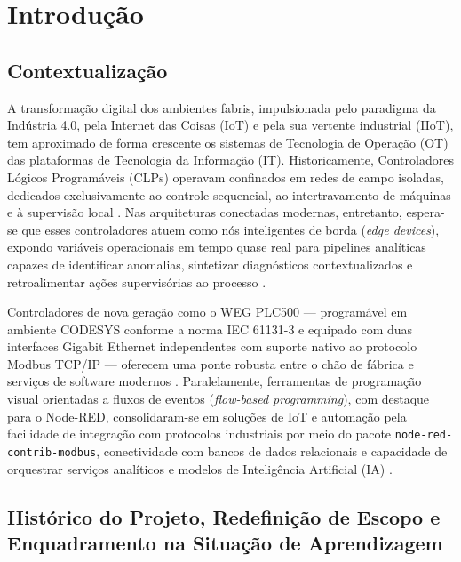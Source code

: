 
\chapter{Introdução}
\label{cap:introducao}

\section{Contextualização}
\label{sec:contextualizacao}

A transformação digital dos ambientes fabris, impulsionada pelo paradigma da Indústria 4.0, pela Internet das Coisas (IoT) e pela sua vertente industrial (IIoT), tem aproximado de forma crescente os sistemas de Tecnologia de Operação (OT) das plataformas de Tecnologia da Informação (IT). Historicamente, Controladores Lógicos Programáveis (CLPs) operavam confinados em redes de campo isoladas, dedicados exclusivamente ao controle sequencial, ao intertravamento de máquinas e à supervisão local \cite{moraes_castrucci}. Nas arquiteturas conectadas modernas, entretanto, espera-se que esses controladores atuem como nós inteligentes de borda (\textit{edge devices}), expondo variáveis operacionais em tempo quase real para pipelines analíticas capazes de identificar anomalias, sintetizar diagnósticos contextualizados e retroalimentar ações supervisórias ao processo \cite{chandola_2009, stouffer_nist_ot}.

Controladores de nova geração como o WEG PLC500 --- programável em ambiente CODESYS conforme a norma IEC 61131-3 e equipado com duas interfaces Gigabit Ethernet independentes com suporte nativo ao protocolo Modbus TCP/IP --- oferecem uma ponte robusta entre o chão de fábrica e serviços de software modernos \cite{weg_plc500_manual, iec_61131_3}. Paralelamente, ferramentas de programação visual orientadas a fluxos de eventos (\textit{flow-based programming}), com destaque para o Node-RED, consolidaram-se em soluções de IoT e automação pela facilidade de integração com protocolos industriais por meio do pacote \texttt{node-red-contrib-modbus}, conectividade com bancos de dados relacionais e capacidade de orquestrar serviços analíticos e modelos de Inteligência Artificial (IA) \cite{nodered_docs, nodered_contrib_modbus}.

\section{Histórico do Projeto, Redefinição de Escopo e Enquadramento na Situação de Aprendizagem}
\label{sec:historico_ntp}

